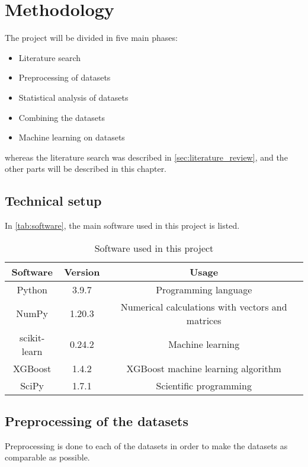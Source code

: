 \chapter{Methodology}
\label{cha:Methodology}

The project will be divided in five main phases:
\begin{itemize}
    \item Literature search
    \item Preprocessing of datasets
    \item Statistical analysis of datasets
    \item Combining the datasets
    \item Machine learning on datasets
\end{itemize}
whereas the literature search was described in \autoref{sec:literature_review}, and the other parts will be described in this chapter.

\section{Technical setup}
In \autoref{tab:software}, the main software used in this project is listed.

\begin{table}[ht]
    \centering
    \begin{tabular}{|c|c|c|}
       \hline
       Software & Version & Usage \\
       \hline 
       Python\tablefootnote{\url{https://www.python.org}} & 3.9.7 & Programming language \\
       \hline
       NumPy\tablefootnote{\url{https://numpy.org}} & 1.20.3 & Numerical calculations with vectors and matrices \\
       \hline
       scikit-learn\tablefootnote{\url{https://scikit-learn.org/}} & 0.24.2 & Machine learning \\
       \hline
       XGBoost\tablefootnote{\url{https://xgboost.readthedocs.io/}} & 1.4.2 & XGBoost machine learning algorithm \\
       \hline
       SciPy\tablefootnote{\url{https://scipy.org}} & 1.7.1 & Scientific programming \\
       \hline
    \end{tabular}
    \caption{Software used in this project}
    \label{tab:software}
\end{table}

\section{Preprocessing of the datasets}
Preprocessing is done to each of the datasets in order to make the datasets as comparable as possible.

